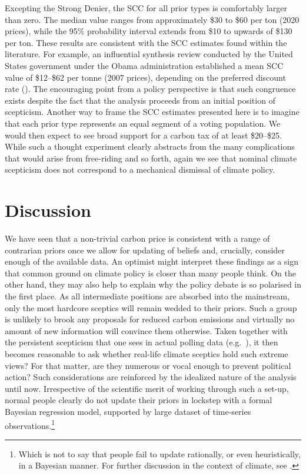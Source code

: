 \documentclass[smallextended]{svjour3}       %
\begin{document}
Excepting the Strong Denier, the SCC for all prior types is comfortably
larger than zero. The median value ranges from approximately \$30 to
\$60 per ton (2020 prices), while the 95\% probability interval extends
from \$10 to upwards of \$130 per ton. These results are consistent with
the SCC estimates found within the literature. For example, an
influential synthesis review conducted by the United States government
under the Obama administration established a mean SCC value of
\$12--\$62 per tonne (2007 prices), depending on the preferred discount
rate (\cite{iwg2016scc}). The encouraging point from a policy
perspective is that such congruence exists despite the fact that the
analysis proceeds from an initial position of scepticism. Another way to
frame the SCC estimates presented here is to imagine that each prior
type represents an equal segment of a voting population. We would then
expect to see broad support for a carbon tax of at least \$20--\$25.
While such a thought experiment clearly abstracts from the many
complications that would arise from free-riding and so forth, again we
see that nominal climate scepticism does not correspond to a mechanical
dismissal of climate policy.

\hypertarget{sec:discussion}{%
\section{Discussion}\label{sec:discussion}}

We have seen that a non-trivial carbon price is consistent with a range
of contrarian priors once we allow for updating of beliefs and,
crucially, consider enough of the available data. An optimist might
interpret these findings as a sign that common ground on climate policy
is closer than many people think. On the other hand, they may also help
to explain why the policy debate is so polarised in the first place. As
all intermediate positions are absorbed into the mainstream, only the
most hardcore sceptics will remain wedded to their priors. Such a group
is unlikely to brook any proposals for reduced carbon emissions and
virtually no amount of new information will convince them otherwise.
Taken together with the persistent scepticism that one sees in actual
polling data (e.g.~\cite{saad2019americans}), it then becomes reasonable
to ask whether real-life climate sceptics hold such extreme views? For
that matter, are they numerous or vocal enough to prevent political
action? Such considerations are reinforced by the idealized nature of
the analysis until now. Irrespective of the scientific merit of working
through such a set-up, normal people clearly do not update their priors
in lockstep with a formal Bayesian regression model, supported by large
dataset of time-series observations.\footnote{Which is not to say that
  people fail to update rationally, or even heuristically, in a Bayesian
  manner. For further discussion in the context of climate, see
  \cite{lewandowsky2019influence}.}
\end{document}
